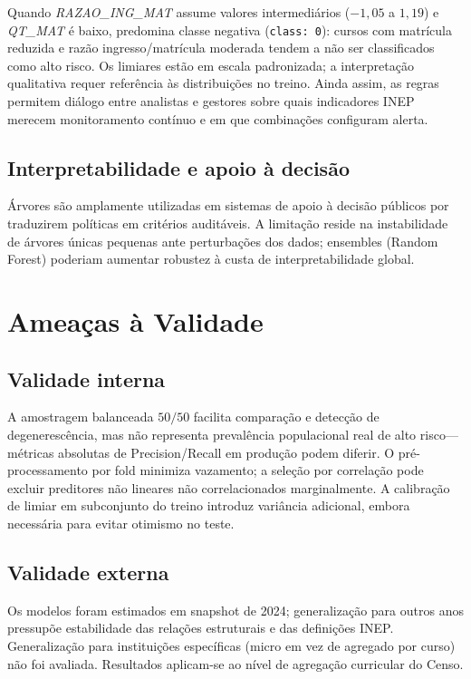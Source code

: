 \documentclass[conference]{IEEEtran}
\begin{document}
Quando \textit{RAZAO\_ING\_MAT} assume valores intermediários ($-1{,}05$ a $1{,}19$) e \textit{QT\_MAT} é baixo, predomina classe negativa (\texttt{class: 0}): cursos com matrícula reduzida e razão ingresso/matrícula moderada tendem a não ser classificados como alto risco. Os limiares estão em escala padronizada; a interpretação qualitativa requer referência às distribuições no treino. Ainda assim, as regras permitem diálogo entre analistas e gestores sobre quais indicadores INEP merecem monitoramento contínuo e em que combinações configuram alerta.

\subsection{Interpretabilidade e apoio à decisão}
Árvores são amplamente utilizadas em sistemas de apoio à decisão públicos por traduzirem políticas em critérios auditáveis. A limitação reside na instabilidade de árvores únicas pequenas ante perturbações dos dados; ensembles (Random Forest) poderiam aumentar robustez à custa de interpretabilidade global.

\section{Ameaças à Validade}
\label{sec:ameacas}

\subsection{Validade interna}
A amostragem balanceada $50/50$ facilita comparação e detecção de degenerescência, mas não representa prevalência populacional real de alto risco---métricas absolutas de Precision/Recall em produção podem diferir. O pré-processamento por fold minimiza vazamento; a seleção por correlação pode excluir preditores não lineares não correlacionados marginalmente. A calibração de limiar em subconjunto do treino introduz variância adicional, embora necessária para evitar otimismo no teste.

\subsection{Validade externa}
Os modelos foram estimados em snapshot de 2024; generalização para outros anos pressupõe estabilidade das relações estruturais e das definições INEP. Generalização para instituições específicas (micro em vez de agregado por curso) não foi avaliada. Resultados aplicam-se ao nível de agregação curricular do Censo.
\end{document}
